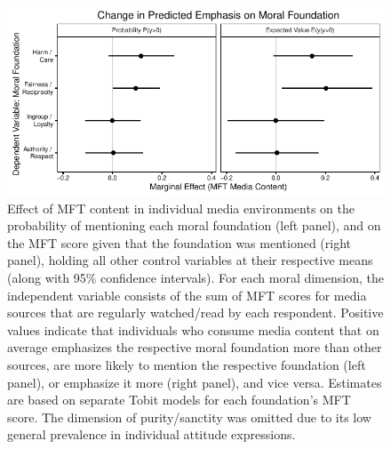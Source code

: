 \documentclass[12pt]{article}
\begin{document}
\begin{figure}[ht]\centering
\includegraphics{../calc/fig/tobit_media.pdf}
\caption{Effect of MFT content in individual media environments on the probability of mentioning each moral foundation (left panel), and on the MFT score given that the foundation was mentioned (right panel), holding all other control variables at their respective means (along with 95\% confidence intervals). For each moral dimension, the independent variable consists of the sum of MFT scores for media sources that are regularly watched/read by each respondent. Positive values indicate that individuals who consume media content that on average emphasizes the respective moral foundation more than other sources, are more likely to mention the respective foundation (left panel), or emphasize it more (right panel), and vice versa. Estimates are based on separate Tobit models for each foundation's MFT score. The dimension of purity/sanctity was omitted due to its low general prevalence in individual attitude expressions.
}\label{fig:tobit_media}
\end{figure}
\end{document}
